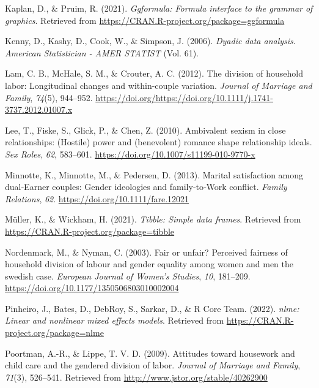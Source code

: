 \documentclass[
  english,
  man]{apa6}
\begin{document}
\leavevmode\hypertarget{ref-R-ggformula}{}%
Kaplan, D., \& Pruim, R. (2021). \emph{Ggformula: Formula interface to the grammar of graphics}. Retrieved from \url{https://CRAN.R-project.org/package=ggformula}

\leavevmode\hypertarget{ref-Kenny}{}%
Kenny, D., Kashy, D., Cook, W., \& Simpson, J. (2006). \emph{Dyadic data analysis}. \emph{American Statistician - AMER STATIST} (Vol. 61).

\leavevmode\hypertarget{ref-Lam}{}%
Lam, C. B., McHale, S. M., \& Crouter, A. C. (2012). The division of household labor: Longitudinal changes and within-couple variation. \emph{Journal of Marriage and Family}, \emph{74}(5), 944--952. \url{https://doi.org/https://doi.org/10.1111/j.1741-3737.2012.01007.x}

\leavevmode\hypertarget{ref-Lee}{}%
Lee, T., Fiske, S., Glick, P., \& Chen, Z. (2010). Ambivalent sexism in close relationships: (Hostile) power and (benevolent) romance shape relationship ideals. \emph{Sex Roles}, \emph{62}, 583--601. \url{https://doi.org/10.1007/s11199-010-9770-x}

\leavevmode\hypertarget{ref-Minnotte}{}%
Minnotte, K., Minnotte, M., \& Pedersen, D. (2013). Marital satisfaction among dual‐Earner couples: Gender ideologies and family‐to‐Work conflict. \emph{Family Relations}, \emph{62}. \url{https://doi.org/10.1111/fare.12021}

\leavevmode\hypertarget{ref-R-tibble}{}%
Müller, K., \& Wickham, H. (2021). \emph{Tibble: Simple data frames}. Retrieved from \url{https://CRAN.R-project.org/package=tibble}

\leavevmode\hypertarget{ref-Nordenmark}{}%
Nordenmark, M., \& Nyman, C. (2003). Fair or unfair? Perceived fairness of household division of labour and gender equality among women and men the swedish case. \emph{European Journal of Women's Studies}, \emph{10}, 181--209. \url{https://doi.org/10.1177/1350506803010002004}

\leavevmode\hypertarget{ref-R-nlme}{}%
Pinheiro, J., Bates, D., DebRoy, S., Sarkar, D., \& R Core Team. (2022). \emph{nlme: Linear and nonlinear mixed effects models}. Retrieved from \url{https://CRAN.R-project.org/package=nlme}

\leavevmode\hypertarget{ref-Poortman}{}%
Poortman, A.-R., \& Lippe, T. V. D. (2009). Attitudes toward housework and child care and the gendered division of labor. \emph{Journal of Marriage and Family}, \emph{71}(3), 526--541. Retrieved from \url{http://www.jstor.org/stable/40262900}
\end{document}
